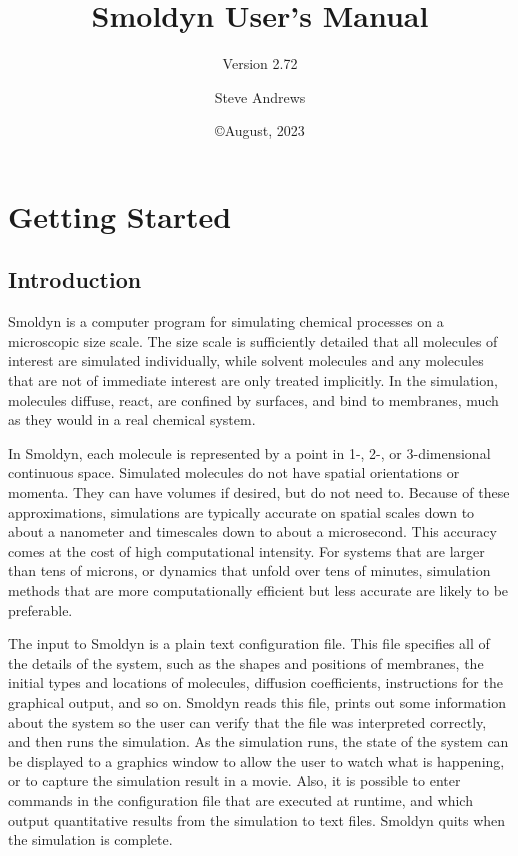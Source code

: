 \documentclass {scrbook}
\begin{document}


\title{Smoldyn User's Manual}
\subtitle{Version 2.72}
\date{\copyright August, 2023}
\author{Steve Andrews}
\maketitle

\tableofcontents


\part{Getting Started}

\chapter{Introduction}

Smoldyn is a computer program for simulating chemical processes on a microscopic size scale. The size scale is sufficiently detailed that all molecules of interest are simulated individually, while solvent molecules and any molecules that are not of immediate interest are only treated implicitly. In the simulation, molecules diffuse, react, are confined by surfaces, and bind to membranes, much as they would in a real chemical system.

In Smoldyn, each molecule is represented by a point in 1-, 2-, or 3-dimensional continuous space. Simulated molecules do not have spatial orientations or momenta. They can have volumes if desired, but do not need to. Because of these approximations, simulations are typically accurate on spatial scales down to about a nanometer and timescales down to about a microsecond. This accuracy comes at the cost of high computational intensity. For systems that are larger than tens of microns, or dynamics that unfold over tens of minutes, simulation methods that are more computationally efficient but less accurate are likely to be preferable.

The input to Smoldyn is a plain text configuration file. This file specifies all of the details of the system, such as the shapes and positions of membranes, the initial types and locations of molecules, diffusion coefficients, instructions for the graphical output, and so on. Smoldyn reads this file, prints out some information about the system so the user can verify that the file was interpreted correctly, and then runs the simulation. As the simulation runs, the state of the system can be displayed to a graphics window to allow the user to watch what is happening, or to capture the simulation result in a movie. Also, it is possible to enter commands in the configuration file that are executed at runtime, and which output quantitative results from the simulation to text files. Smoldyn quits when the simulation is complete.
\end{document}
